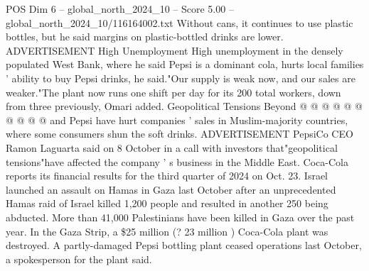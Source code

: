 \begin{textsample}{POS Dim 6 – global\_north\_2024\_10 – Score 5.00 – global\_north\_2024\_10/116164002.txt}
Without cans, it continues to use plastic bottles, but he said margins on plastic-bottled drinks are lower.
ADVERTISEMENT High Unemployment High unemployment in the densely populated West Bank, where he said Pepsi is a dominant cola, hurts local families ' ability to buy Pepsi drinks, he said."Our supply is weak now, and our sales are weaker."The plant now runs one shift per day for its 200 total workers, down from three previously, Omari added.
Geopolitical Tensions Beyond @ @ @ @ @ @ @ @ @ @ and Pepsi have hurt companies ' sales in Muslim-majority countries, where some consumers shun the soft drinks.
ADVERTISEMENT PepsiCo CEO Ramon Laguarta said on 8 October in a call with investors that"geopolitical tensions"have affected the company ' s business in the Middle East.
Coca-Cola reports its financial results for the third quarter of 2024 on Oct. 23.
Israel launched an assault on Hamas in Gaza last October after an unprecedented Hamas raid of Israel killed 1,200 people and resulted in another 250 being abducted.
More than 41,000 Palestinians have been killed in Gaza over the past year.
In the Gaza Strip, a \$25 million (? 23 million ) Coca-Cola plant was destroyed.
A partly-damaged Pepsi bottling plant ceased operations last October, a spokesperson for the plant said.

\end{textsample}
